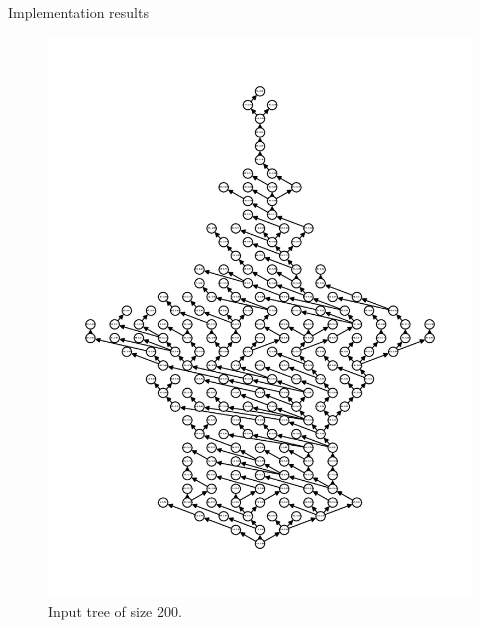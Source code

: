 \begin{frame}[allowframebreaks]{Implementation results}
\begin{figure}[htp]
{\begin{minipage}[t]{0.49\textwidth}
            \includegraphics[width=\textwidth]{figures/computed/tree_200.pdf}
            \caption{Input tree of size 200.}
        \end{minipage}
        \begin{minipage}[t]{0.49\textwidth}
            \centering

\end{minipage}}
\end{figure}
\end{frame}
